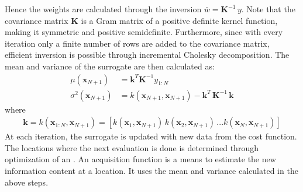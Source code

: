 \documentclass[letterpaper,12pt,english]{sphinxmanual}
\begin{document}
\sphinxAtStartPar
Hence the weights are calculated through the inversion \(\bar{w} = \mathbf{K}^{-1}\,y\). Note that the covariance
matrix \(\mathbf{K}\) is a Gram matrix of a positive definite kernel function, making it symmetric and positive
semi\sphinxhyphen{}definite. Furthermore, since with every iteration only a finite number of rows are added to the covariance matrix,
efficient inversion is possible through incremental Cholesky decomposition. The mean and variance of the surrogate
are then calculated as:
\begin{equation*}
\begin{split}\mu(\mathbf{x}_{N+1}) & = \mathbf{k}^T \mathbf{K}^{-1} y_{1:N} \\
\sigma^2(\mathbf{x}_{N+1}) & = k(\mathbf{x}_{N+1}, \mathbf{x}_{N+1}) - \mathbf{k}^T\,\mathbf{K}^{-1}\,\mathbf{k}\end{split}
\end{equation*}
\sphinxAtStartPar
where
\begin{equation*}
\begin{split}\mathbf{k} = k(\mathbf{x}_{1:N}, \mathbf{x}_{N+1}) = [k(\mathbf{x}_1,\mathbf{x}_{N+1})\, k(\mathbf{x}_2,\mathbf{x}_{N+1})\, . . .            k(\mathbf{x}_N,\mathbf{x}_{N+1})]\end{split}
\end{equation*}
\sphinxAtStartPar
At each iteration, the surrogate is updated with new data from the cost function. The locations where the next
evaluation is done is determined through optimization of an . An acquisition function is a means
to estimate the new information content at a location. It uses the mean and variance calculated in the above steps.
\end{document}
